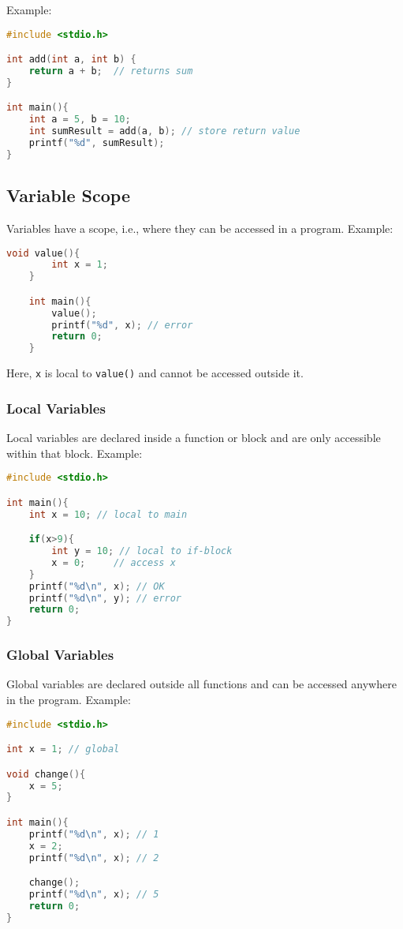 Example:
\begin{lstlisting}[language=c]
#include <stdio.h>

int add(int a, int b) {
	return a + b;  // returns sum
}

int main(){
	int a = 5, b = 10;
	int sumResult = add(a, b); // store return value
	printf("%d", sumResult);
}
\end{lstlisting}

\subsection{Variable Scope}

Variables have a scope, i.e., where they can be accessed in a program.  
Example:
\begin{lstlisting}[language=c]
	void value(){
		int x = 1;
	}

	int main(){
		value();
		printf("%d", x); // error
		return 0;
	}
\end{lstlisting}
Here, \verb|x| is local to \verb|value()| and cannot be accessed outside it.

\subsubsection{Local Variables}

Local variables are declared inside a function or block and are only accessible within that block.  
Example:
\begin{lstlisting}[language=c]
#include <stdio.h>

int main(){
	int x = 10; // local to main

	if(x>9){
		int y = 10; // local to if-block
		x = 0;     // access x
	}
	printf("%d\n", x); // OK
	printf("%d\n", y); // error
	return 0;
}
\end{lstlisting}

\subsubsection{Global Variables}

Global variables are declared outside all functions and can be accessed anywhere in the program.  
Example:
\begin{lstlisting}[language=c]
#include <stdio.h>

int x = 1; // global

void change(){
	x = 5;
}

int main(){
	printf("%d\n", x); // 1
	x = 2;
	printf("%d\n", x); // 2

	change(); 
	printf("%d\n", x); // 5
	return 0;
}
\end{lstlisting}

